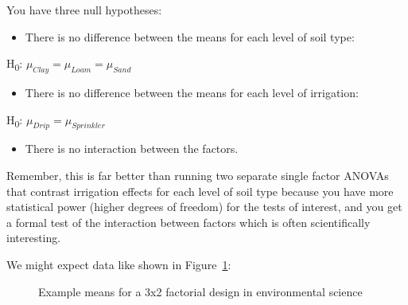 \documentclass[
  letterpaper,
  DIV=11,
  numbers=noendperiod]{scrreprt}
\providecommand{\tightlist}{%
  \setlength{\itemsep}{0pt}\setlength{\parskip}{0pt}}\usepackage{longtable,booktabs,array}
\begin{document}
You have three null hypotheses:

\begin{itemize}
\tightlist
\item
  There is no difference between the means for each level of soil type:
\end{itemize}

H\textsubscript{0}: \(\mu_{Clay} = \mu_{Loam} = \mu_{Sand}\)\\

\begin{itemize}
\tightlist
\item
  There is no difference between the means for each level of irrigation:
\end{itemize}

H\textsubscript{0}: \(\mu_{Drip} = \mu_{Sprinkler}\)\\

\begin{itemize}
\tightlist
\item
  There is no interaction between the factors.
\end{itemize}

Remember, this is far better than running two separate single factor
ANOVAs that contrast irrigation effects for each level of soil type
because you have more statistical power (higher degrees of freedom) for
the tests of interest, and you get a formal test of the interaction
between factors which is often scientifically interesting.

We might expect data like shown in Figure~\ref{fig-1123design}:

\begin{figure}


\caption{\label{fig-1123design}Example means for a 3x2 factorial design
in environmental science}

\end{figure}%
\end{document}
